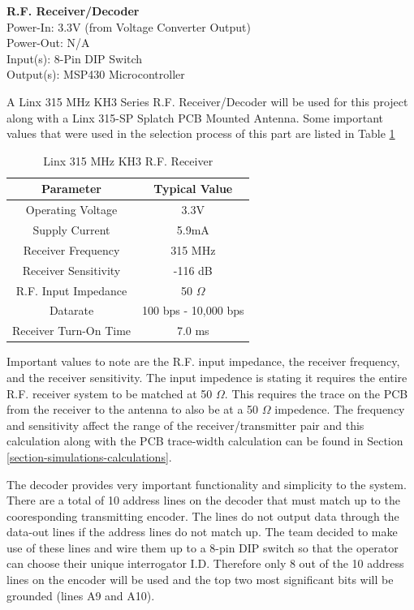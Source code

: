 \documentclass[letterpaper,10pt]{article}
\begin{document}
\begin{spacing}{1.15}
\normalsize\textbf{R.F. Receiver/Decoder} \\
Power-In: 3.3V (from Voltage Converter Output) \\
Power-Out: N/A \\
Input(s): 8-Pin DIP Switch\\
Output(s): MSP430 Microcontroller

A Linx 315 MHz KH3 Series R.F. Receiver/Decoder will be used for this project along with a Linx 315-SP Splatch PCB Mounted Antenna. Some important values that were used in the selection process of this part are listed in Table \ref{tab:rf-receiver-important-values}

\begin{table}[htbp]
	\centering
	\begin{tabular}{c|c}	%
		\toprule	%
		Parameter & Typical Value \\
		\midrule
		Operating Voltage & 3.3V\\
		Supply Current & 5.9mA\\
		Receiver Frequency & 315 MHz \\ 
		Receiver Sensitivity & -116 dB \\
		R.F. Input Impedance & 50 $\Omega$ \\
		Datarate & 100 bps - 10,000 bps  \\
		Receiver Turn-On Time & 7.0 ms  \\
		\bottomrule	%
	\end{tabular}%
	\caption{Linx 315 MHz KH3 R.F. Receiver}
	\label{tab:rf-receiver-important-values}	%
\end{table}%

Important values to note are the R.F. input impedance, the receiver frequency, and the receiver sensitivity. The input impedence is stating it requires the entire R.F. receiver system to be matched at 50 $\Omega$. This requires the trace on the PCB from the receiver to the antenna to also be at a 50 $\Omega$ impedence. The frequency and sensitivity affect the range of the receiver/transmitter pair and this calculation along with the PCB trace-width calculation can be found in Section \ref{section-simulations-calculations}.

The decoder provides very important functionality and simplicity to the system. There are a total of 10 address lines on the decoder that must match up to the cooresponding transmitting encoder. The lines do not output data through the data-out lines if the address lines do not match up. The team decided to make use of these lines and wire them up to a 8-pin DIP switch so that the operator can choose their unique interrogator I.D. Therefore only 8 out of the 10 address lines on the encoder will be used and the top two most significant bits will be grounded (lines A9 and A10).


\end{spacing}
\end{document}
